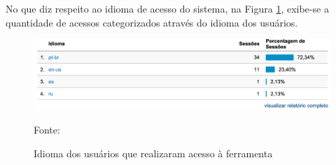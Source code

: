 \FloatBarrier 	%

No que diz respeito ao idioma de acesso do sistema, na Figura
\ref{fig:googleAnalyticsIdioma}, exibe-se a quantidade de acessos categorizados
através do idioma dos usuários.

\begin{figure}[h!tb]
	\caption{Idioma dos usuários que realizaram acesso à ferramenta}
	\label{fig:googleAnalyticsIdioma}

	\centering
	\includegraphics[width=\textwidth]{images/resultados/google-analytics-idioma.png}

	\centering
	\footnotesize Fonte: \fonteOAutor
\end{figure}

\FloatBarrier 	%
